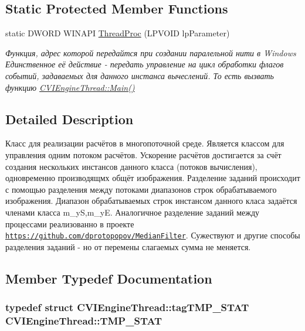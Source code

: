 \subsection*{Static Protected Member Functions}
\begin{DoxyCompactItemize}
\item 
static D\+W\+O\+R\+D W\+I\+N\+A\+P\+I \hyperlink{class_c_v_i_engine_thread_abf714adf1c42385f396ebe4ff48f181c}{Thread\+Proc} (L\+P\+V\+O\+I\+D lp\+Parameter)
\begin{DoxyCompactList}\small\item\em Функция, адрес которой передайтся при создании паралельной нити в Windows Единственное её действие -\/ передать управление на цикл обработки флагов событий, задаваемых для данного инстанса вычеслений. То есть вызвать функцию \hyperlink{class_c_v_i_engine_thread_a24ed1bd13eea28048ed010e65697e578}{C\+V\+I\+Engine\+Thread\+::\+Main()} \end{DoxyCompactList}\end{DoxyCompactItemize}


\subsection{Detailed Description}
Класс для реализации расчётов в многопоточной среде. Является классом для управления одним потоком расчётов. Ускорение расчётов достигается за счёт создания нескольких инстансов данного класса (потоков вычисления), одновременно производящмх общёт изображения. Разделение заданий происходит с помощью разделения между потоками диапазонов строк обрабатываемого изображения. Диапазон обрабатываемых строк инстансом данного класа задаётся членами класса m\+\_\+y\+S,m\+\_\+y\+E. Аналогичное разделение заданий между процессами реализованно в проекте \href{https://github.com/dprotopopov/MedianFilter}{\tt https\+://github.\+com/dprotopopov/\+Median\+Filter}. Сужествуют и другие способы разделения заданий -\/ но от перемены слагаемых сумма не меняется. 



\subsection{Member Typedef Documentation}
\hypertarget{class_c_v_i_engine_thread_a963dcd94cfc9dd191a6c4dc50458797f}{
\subsubsection[{T\+M\+P\+\_\+\+S\+T\+A\+T}]{\setlength{\rightskip}{0pt plus 5cm}typedef struct {\bf C\+V\+I\+Engine\+Thread\+::tag\+T\+M\+P\+\_\+\+S\+T\+A\+T}  {\bf C\+V\+I\+Engine\+Thread\+::\+T\+M\+P\+\_\+\+S\+T\+A\+T}}}\label{class_c_v_i_engine_thread_a963dcd94cfc9dd191a6c4dc50458797f}



